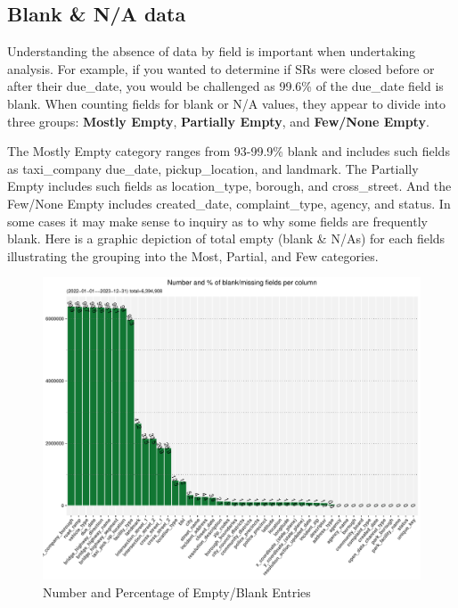 \documentclass[linenumber]{jdsart}
\begin{document}
		
\subsection{Blank \& N/A data}
\label{sec:blanks}
Understanding the absence of data by field is important 
when undertaking analysis. For example, if you wanted to 
determine if SRs were closed before or after their due\_date, 
you would be challenged as 99.6\% of the due\_date field is 
blank. When counting fields for blank or N/A values, they appear 
to divide into three groups: \textbf{Mostly Empty}, \textbf{Partially Empty}, 
and \textbf{Few/None Empty}. 

The Mostly Empty category ranges from 93-99.9\% blank 
and includes such fields as taxi\_company due\_date, pickup\_location, and 
landmark. The Partially Empty includes such fields as location\_type, borough, 
and cross\_street. And the Few/None Empty includes created\_date, 
complaint\_type, agency, and status. In some cases it may make 
sense to inquiry as to why some fields are frequently blank. Here is a graphic 
depiction of total empty (blank \& N/As) for each fields illustrating
the grouping into the Most, Partial, and Few categories. 


\begin{figure}[tbp]
	\centering
  	\includegraphics[width=\textwidth]{BlankFields.pdf}
	\caption{Number and Percentage of Empty/Blank Entries}
	\label{fig:blank_fields}
\end{figure}
\end{document}
